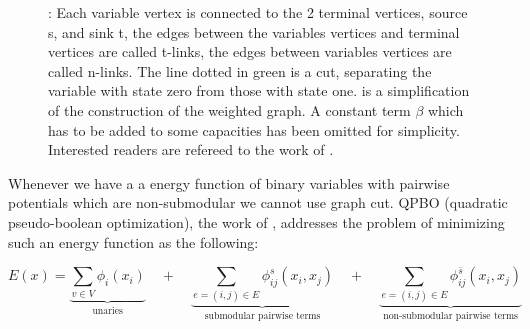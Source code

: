 \begin{figure}[H]
\begin{center}
\hspace{1.5cm}
\end{center}
\caption{
    : Each variable vertex is connected to the 2 terminal vertices, source s, and
        sink t, the edges between the variables vertices and terminal vertices are
        called t-links, the edges between variables vertices are called n-links. The
        line dotted in green is a cut, separating the variable with state zero from
        those with state one.
     is a simplification of the construction of the weighted graph.
        A constant term $\beta$ which has to be added to some capacities
        has been omitted for simplicity. 
        Interested readers are refereed to  the work of \citet{kolmogorov_2004_pami}.
}\label{fig:graph_cut}
\end{figure}


Whenever we have a a energy function of binary variables with pairwise potentials which
are non-submodular we cannot use graph cut. QPBO (quadratic pseudo-boolean optimization), 
the work of \citet{rother_2007_cvpr}, 
addresses the problem of minimizing such an energy function as the
following:

\begin{equation} \label{eq:gm_qpbo_energy}
    E(x) = 
    \underbrace{
        \sum_{v \in V} \phi_i(x_i)
    }_{\text{unaries}}
    \quad +  \quad
    \underbrace{
        \sum_{e=(i,j) \in E } \phi^{s}_{ij}(x_i,x_j)
    }_{\text{submodular pairwise terms}}
    \quad +  \quad
    \underbrace{
        \sum_{e=(i,j) \in E } \phi^{\bar{s}}_{ij}(x_i,x_j)
    }_{\text{non-submodular pairwise terms}}
\end{equation}

